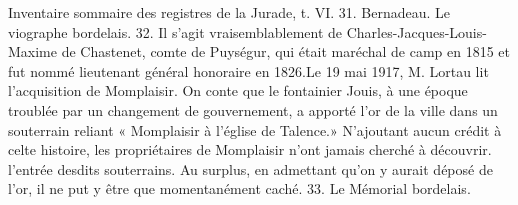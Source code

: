 Inventaire sommaire des registres de la Jurade, t. VI. 31. Bernadeau. Le viographe bordelais. 32. Il s'agit vraisemblablement de Charles-Jacques-Louis-Maxime de Chastenet, comte de Puységur, qui était maréchal de camp en 1815 et fut nommé lieutenant général honoraire en 1826.Le 19 mai 1917, M. Lortau lit l'acquisition de Momplaisir. On conte que le fontainier Jouis, à une époque troublée par un changement de gouvernement, a apporté l'or de la ville dans un souterrain reliant « Momplaisir à l'église de Talence.» N'ajoutant aucun crédit à celte histoire, les propriétaires de Momplaisir n'ont jamais cherché à découvrir. l'entrée desdits souterrains. Au surplus, en admettant qu'on y aurait déposé de l'or, il ne put y être que momentanément caché. 33. Le Mémorial bordelais.